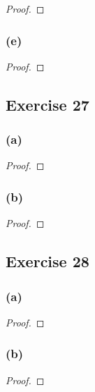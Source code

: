 \documentclass[14pt]{extarticle}
\begin{document}
\begin{proof}

\end{proof}

\subsubsection{(e)}

\begin{proof}

\end{proof}

\subsection{Exercise 27}

\subsubsection{(a)}

\begin{proof}

\end{proof}

\subsubsection{(b)}

\begin{proof}

\end{proof}

\subsection{Exercise 28}

\subsubsection{(a)}

\begin{proof}

\end{proof}

\subsubsection{(b)}

\begin{proof}

\end{proof}
\end{document}
